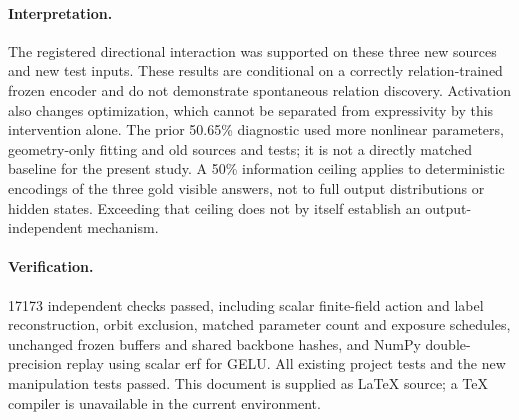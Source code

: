 \documentclass[11pt]{article}
\begin{document}
\paragraph{Interpretation.}
The registered directional interaction was supported on these three new sources and new test inputs. These results are conditional on a correctly relation-trained frozen encoder and do not demonstrate spontaneous relation discovery. Activation also changes optimization, which cannot be separated from expressivity by this intervention alone. The prior 50.65\% diagnostic used more nonlinear parameters, geometry-only fitting and old sources and tests; it is not a directly matched baseline for the present study. A 50\% information ceiling applies to deterministic encodings of the three gold visible answers, not to full output distributions or hidden states. Exceeding that ceiling does not by itself establish an output-independent mechanism.
\paragraph{Verification.}
17173 independent checks passed, including scalar finite-field action and label reconstruction, orbit exclusion, matched parameter count and exposure schedules, unchanged frozen buffers and shared backbone hashes, and NumPy double-precision replay using scalar erf for GELU. All existing project tests and the new manipulation tests passed. This document is supplied as LaTeX source; a TeX compiler is unavailable in the current environment.
\end{document}
